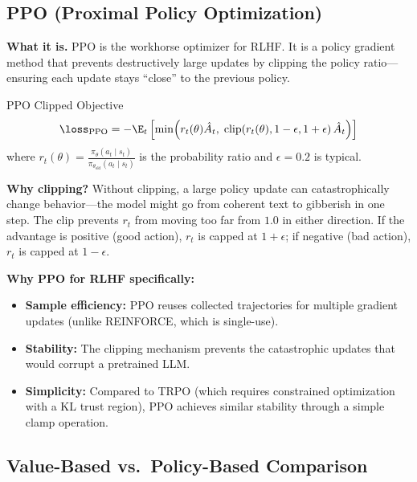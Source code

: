 \subsection{PPO (Proximal Policy Optimization)}

\textbf{What it is.} PPO is the workhorse optimizer for RLHF. It is a policy gradient method that prevents destructively large updates by clipping the policy ratio---ensuring each update stays ``close'' to the previous policy.

\begin{mathresult}{PPO Clipped Objective}
\begin{equation}
\loss_{\text{PPO}} = -\E_t\left[\min\!\left(r_t(\theta) \hat{A}_t,\; \text{clip}\!\left(r_t(\theta), 1-\epsilon, 1+\epsilon\right)\hat{A}_t\right)\right]
\end{equation}
where $r_t(\theta) = \frac{\pi_\theta(a_t \mid s_t)}{\pi_{\theta_{\text{old}}}(a_t \mid s_t)}$ is the probability ratio and $\epsilon = 0.2$ is typical.
\end{mathresult}

\textbf{Why clipping?} Without clipping, a large policy update can catastrophically change behavior---the model might go from coherent text to gibberish in one step. The clip prevents $r_t$ from moving too far from $1.0$ in either direction. If the advantage is positive (good action), $r_t$ is capped at $1 + \epsilon$; if negative (bad action), $r_t$ is capped at $1 - \epsilon$.

\textbf{Why PPO for RLHF specifically:}
\begin{itemize}
    \item \textbf{Sample efficiency:} PPO reuses collected trajectories for multiple gradient updates (unlike REINFORCE, which is single-use).
    \item \textbf{Stability:} The clipping mechanism prevents the catastrophic updates that would corrupt a pretrained LLM.
    \item \textbf{Simplicity:} Compared to TRPO (which requires constrained optimization with a KL trust region), PPO achieves similar stability through a simple clamp operation.
\end{itemize}

\subsection{Value-Based vs.\ Policy-Based Comparison}

